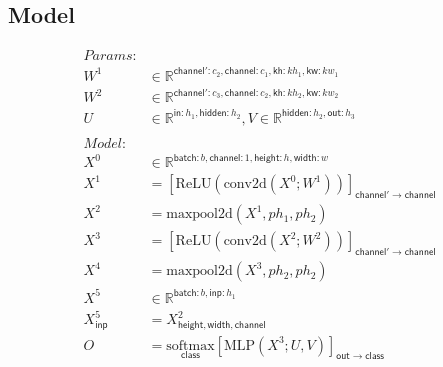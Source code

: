 \documentclass{article}
\newcommand{\reals}[0]{\mathbb{R}}
\newcommand{\name}[1]{\mathsf{#1}}
\newcommand{\nfun}[2]{\underset{\name{#1}}{#2}}
\begin{document}
\subsection*{Model}

\begin{align*} 
\textit{Params}: \\
W^1 & \in \reals^{\name{channel'}: c_2, \name{channel}:c_1, \name{kh}: kh_1, \name{kw}:kw_1} \\ 
W^2 & \in \reals^{\name{channel'}: c_3, \name{channel}:c_2, \name{kh}:kh_2, \name{kw}:kw_2} \\ 
U & \in \reals^{\name{in}: h_1 , \name{hidden}:h_2},  V \in \reals^{\name{hidden}:h_2, \name{out}:h_3} \\ \\
\textit{Model}: \\
X^0 &\in \reals^{\name{batch}:b, \name{channel}:1, \name{height}:h, \name{width}:w}\\
X^1 &= \left[\text{ReLU}(\text{conv2d}(X^0; W^1))\right]_{\name{channel'}\rightarrow\name{channel}}\\ 
X^2 &= \text{maxpool2d}(X^1, ph_1, ph_2) \\
X^3 &= \left[\text{ReLU}(\text{conv2d}(X^2; W^2)) \right]_{\name{channel'}\rightarrow\name{channel}} \\
X^4 &= \text{maxpool2d}(X^3, ph_2, ph_2) \\
X^5 &\in \reals^{\name{batch}:b, \name{inp}:h_1 }\\ 
X^5_{\name{inp}} &= X^2_{\name{height}, \name{width}, \name{channel}}\\ 
O &= \nfun{class}{\text{softmax}}\left[\text{MLP}(X^3; U, V)\right]_{\name{out}\rightarrow \name{class}} \\ 
\end{align*} 


\end{document}
